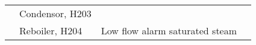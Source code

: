 \begin{table}[h]
{\begin{tabular}{@{}llll@{}}
\multicolumn{1}{|l|}{}                    & \multicolumn{1}{l|}{\multirow{3}{*}{Condensor, H203}}                                                      & \multicolumn{1}{l|}{}                                                                                                                                                                                                               & \multicolumn{1}{l|}{}                                                                                                                                                                                                                                                        \\ \cmidrule(l){3-4} 
\multicolumn{1}{|l|}{}                    & \multicolumn{1}{l|}{}                                                                                      & \multicolumn{1}{l|}{}                                                                                                                                                                                                               & \multicolumn{1}{l|}{}                                                                                                                                                                                                                                                        \\ \cmidrule(l){3-4} 
\multicolumn{1}{|l|}{}                    & \multicolumn{1}{l|}{}                                                                                      & \multicolumn{1}{l|}{}                                                                                                                                                                                                               & \multicolumn{1}{l|}{}                                                                                                                                                                                                                                                        \\ \cmidrule(l){2-4} 
\multicolumn{1}{|l|}{}                    & \multicolumn{1}{l|}{Reboiler, H204}                                                                        & \multicolumn{1}{l|}{Low flow alarm   saturated steam}                                                                                                                                                                               & \multicolumn{1}{l|}{}                                                                                                                                                                                                                                                        \\ \bottomrule
\end{tabular}%
}
\end{table}
